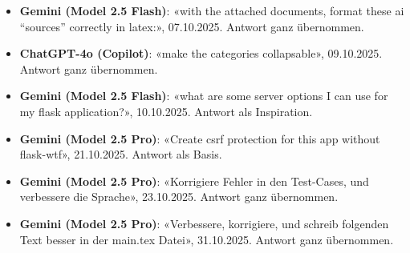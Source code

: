 \documentclass[12pt, a4paper]{article}
\begin{document}
\begin{itemize}
    \item \textbf{Gemini (Model 2.5 Flash)}: «with the attached documents, format these ai ``sources'' correctly in latex:», 07.10.2025. Antwort ganz übernommen.
    
    \item \textbf{ChatGPT-4o (Copilot)}: «make the categories collapsable», 09.10.2025. Antwort ganz übernommen.

    \item \textbf{Gemini (Model 2.5 Flash)}: «what are some server options I can use for my flask application?», 10.10.2025. Antwort als Inspiration.

    \item \textbf{Gemini (Model 2.5 Pro)}: «Create csrf protection for this app without flask-wtf», 21.10.2025. Antwort als Basis.

    \item \textbf{Gemini (Model 2.5 Pro)}: «Korrigiere Fehler in den Test-Cases, und verbessere die Sprache», 23.10.2025. Antwort ganz übernommen.

    \item \textbf{Gemini (Model 2.5 Pro)}: «Verbessere, korrigiere, und schreib folgenden Text besser in der main.tex Datei», 31.10.2025. Antwort ganz übernommen.
    
\end{itemize}
\end{document}
